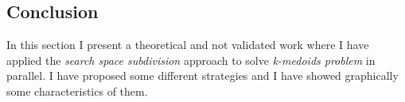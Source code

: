 %
%
%
%
%
%

\subsection{Conclusion}

In this section I present a theoretical and not validated work where I have applied the {\it search space subdivision} approach to solve {\it k-medoids problem} in parallel. I have proposed some different strategies and I have showed graphically some characteristics of them. 